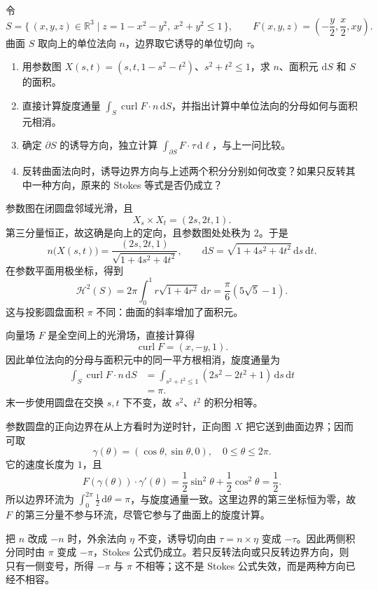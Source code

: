 \begin{optionalexercise}\label{b2:ex:01-paraboloid-stokes}
令
\[
 S=\{\,(x,y,z)\in\mathbb R^3\mid z=1-x^2-y^2,\ x^2+y^2\leq1\,\},
 \qquad F(x,y,z)=\left(-\frac y2,\frac x2,xy\right).
\]
曲面 \(S\) 取向上的单位法向 \(n\)，边界取它诱导的单位切向 \(\tau\)。
\begin{enumerate}
 \item\label{b2:item:01-paraboloid-area} 用参数图 \(X(s,t)=(s,t,1-s^2-t^2)\)、\(s^2+t^2\leq1\)，求 \(n\)、面积元 \(\mathrm dS\) 和 \(S\) 的面积。
 \item\label{b2:item:01-paraboloid-curl} 直接计算旋度通量 \(\int_S\operatorname{curl}F\cdot n\,\mathrm dS\)，并指出计算中单位法向的分母如何与面积元相消。
 \item\label{b2:item:01-paraboloid-boundary} 确定 \(\partial S\) 的诱导方向，独立计算 \(\int_{\partial S}F\cdot\tau\,\mathrm d\ell\)，与上一问比较。
 \item\label{b2:item:01-paraboloid-reversal} 反转曲面法向时，诱导边界方向与上述两个积分分别如何改变？如果只反转其中一种方向，原来的 Stokes 等式是否仍成立？
\end{enumerate}
\end{optionalexercise}
\begin{solution}
参数图在闭圆盘邻域光滑，且
\[
 X_s\times X_t=(2s,2t,1).
\]
第三分量恒正，故这确是向上的定向，且参数图处处秩为 \(2\)。于是
\[
 n\bigl(X(s,t)\bigr)=\frac{(2s,2t,1)}{\sqrt{1+4s^2+4t^2}},
 \qquad \mathrm dS=\sqrt{1+4s^2+4t^2}\,\mathrm ds\,\mathrm dt.
\]
在参数平面用极坐标，得到
\[
 \mathcal H^2(S)=2\pi\int_0^1 r\sqrt{1+4r^2}\,\mathrm dr
 =\frac\pi6(5\sqrt5-1).
\]
这与投影圆盘面积 \(\pi\) 不同：曲面的斜率增加了面积元。

向量场 \(F\) 是全空间上的光滑场，直接计算得
\[
 \operatorname{curl}F=(x,-y,1).
\]
因此单位法向的分母与面积元中的同一平方根相消，旋度通量为
\[
 \begin{aligned}
 \int_S\operatorname{curl}F\cdot n\,\mathrm dS
 &=\int_{s^2+t^2\leq1}(2s^2-2t^2+1)\,\mathrm ds\,\mathrm dt\\
 &=\pi.
 \end{aligned}
\]
末一步使用圆盘在交换 \(s,t\) 下不变，故 \(s^2\)、\(t^2\) 的积分相等。

参数圆盘的正向边界在从上方看时为逆时针，正向图 \(X\) 把它送到曲面边界；因而可取
\[
 \gamma(\theta)=(\cos\theta,\sin\theta,0),\quad0\leq\theta\leq2\pi.
\]
它的速度长度为 \(1\)，且
\[
 F(\gamma(\theta))\cdot\gamma'(\theta)
 =\frac12\sin^2\theta+\frac12\cos^2\theta=\frac12.
\]
所以边界环流为 \(\int_0^{2\pi}\frac12\,\mathrm d\theta=\pi\)，与旋度通量一致。这里边界的第三坐标恒为零，故 \(F\) 的第三分量不参与环流，尽管它参与了曲面上的旋度计算。

把 \(n\) 改成 \(-n\) 时，外余法向 \(\eta\) 不变，诱导切向由 \(\tau=n\times\eta\) 变成 \(-\tau\)。因此两侧积分同时由 \(\pi\) 变成 \(-\pi\)，Stokes 公式仍成立。若只反转法向或只反转边界方向，则只有一侧变号，所得 \(-\pi\) 与 \(\pi\) 不相等；这不是 Stokes 公式失效，而是两种方向已经不相容。
\end{solution}
